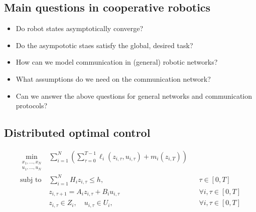 \documentclass{book}
\theoremstyle{theoremv2}
\theoremstyle{defv2}
\theoremstyle{remark}
\theoremstyle{remark}
\theoremstyle{definition}
\theoremstyle{definition}
\begin{document}
\subsection{Main questions in cooperative robotics}
\begin{itemize}
    \item Do robot states asymptotically converge? 
    \item Do the asympototic staes satisfy the global, desired task?
    \item How can we model communication in (general) robotic networks?
    \item What assumptions do we need on the communication network?
    \item Can we answer the above questions for general networks and communication protocols?
\end{itemize}
\subsection{Distributed optimal control}
\begin{align*}
    \min_{\substack{x_1,\dots,x_N \\ u_1,\dots,u_N}} & \displaystyle\sum_{i=1}^{N}(\displaystyle\sum_{\tau=0}^{T-1}\ell_i(z_{i,\tau},u_{i,\tau})+m_i(z_{i,T}))\\
    \text{subj to} & \displaystyle\sum_{i=1}^{N}H_iz_{i,\tau}\leq h, && \tau\in[0,T]\\ 
    & z_{i,\tau+1}=A_iz_{i,\tau}+B_iu_{i,\tau} && \forall i, \tau \in [0,T]\\ 
    & z_{i,\tau}\in Z_i, \quad u_{i,\tau}\in U_i, && \forall i, \tau \in [0,T]\\ 
\end{align*}
\end{document}
